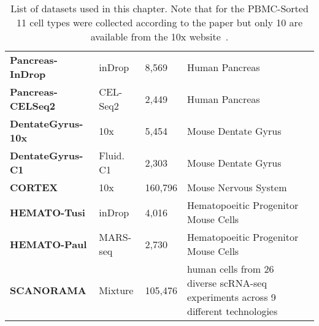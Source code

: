 \begin{table}
\begin{small}
\begin{tabularx}{\textwidth}{lllXl}
\textbf{Pancreas-InDrop} & inDrop  & 8,569 & Human Pancreas & \cite{pancreasindrop}\\[0.2cm]

\textbf{Pancreas-CELSeq2} & CEL-Seq2 & 2,449 & Human Pancreas & \cite{pancreascelseq}\\[0.2cm]

\textbf{DentateGyrus-10x} & 10x &5,454 & Mouse Dentate Gyrus & \cite{dentategyrus2018}\\[0.2cm]

\textbf{DentateGyrus-C1} & Fluid. C1 & 2,303 & Mouse Dentate Gyrus & \cite{dentategyrus2018}\\[1cm]

\textbf{CORTEX} & 10x & 160,796  & Mouse Nervous System & \cite{zeisel2018}\\[1cm]

\textbf{HEMATO-Tusi} & inDrop & 4,016 & Hematopoeitic Progenitor Mouse Cells & \cite{Tusi2018}\\[0.2cm]

\textbf{HEMATO-Paul} & MARS-seq & 2,730 & Hematopoeitic Progenitor Mouse Cells & \cite{PAUL2015}\\[1cm]

\textbf{SCANORAMA} & Mixture & 105,476 & human cells from 26 diverse scRNA-seq experiments across 9 different technologies & \cite{scanorama}\\
\bottomrule
\end{tabularx}
\caption[List of datasets used in this chapter]{List of datasets used in this chapter. Note that for the PBMC-Sorted 11 cell types were collected according to the paper but only 10 are available from the 10x website~\cite{10x}.\label{scanvidatasets}}
\end{small}

\end{table}
